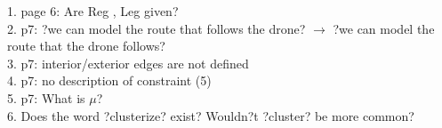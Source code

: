 \documentclass{article}
\newenvironment{reviewer}{\setcounter{pointcounter}{1}}{}
\newcommand{\point}{\text{{\selectfont \thepointcounter} \stepcounter{pointcounter}}}
\begin{document}
\begin{reviewer}
\begin{tcolorbox}[breakable,enhanced,coltitle=black,colback=red!5!white,colframe=red!75!black,title=\textbf{Answer R1.\point},borderline={1pt}{0pt}{black},boxrule=0pt]

\end{tcolorbox}


\begin{itshape}
1. page 6: Are Reg , Leg given?\\
2. p7: ?we can model the route that follows the drone? $\rightarrow$ ?we can model the route that the drone follows?\\
3. p7: interior/exterior edges are not defined\\
4. p7: no description of constraint (5)\\
5. p7: What is $\mu$?\\
6. Does the word ?clusterize? exist? Wouldn?t ?cluster? be more common?\\
\end{itshape}



\end{reviewer}
\end{document}
